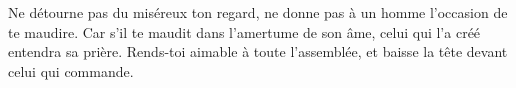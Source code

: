 Ne détourne pas du miséreux ton regard,
	ne donne pas à un homme l’occasion de te maudire.
Car s’il te maudit dans l’amertume de son âme,
	celui qui l’a créé entendra sa prière.
Rends-toi aimable à toute l’assemblée,
	et baisse la tête devant celui qui commande.
